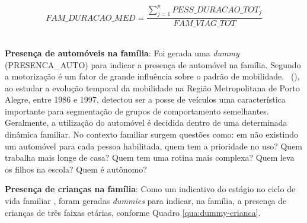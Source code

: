 \begin{compactitem}
\begin{equation}\label{eq:fam-dur-med}
FAM\_DURACAO\_MED=\frac{\displaystyle\sum_{j=1}^{p}PESS\_DURACAO\_TOT_{j}}{FAM\_VIAG\_TOT}
\end{equation}\\

\item \textbf{Presença de automóveis na família}: Foi gerada uma \textit{dummy} \mbox{(PRESENCA_AUTO)} para indicar a presença de automóvel na família.
Segundo  a motorização é um fator de grande influência sobre o padrão de mobilidade. 
\ (\citeyear{PEIXOTO2002}), ao estudar a evolução temporal da mobilidade na Região Metropolitana de Porto Alegre, entre 1986 e 1997, detectou ser a posse de veículos uma característica importante para segmentação de grupos de comportamento semelhantes.
Geralmente, a utilização do automóvel é decidida dentro de uma determinada dinâmica familiar.
No contexto familiar surgem questões como: em não existindo um automóvel para cada pessoa habilitada, quem tem a prioridade no uso? Quem trabalha mais longe de casa? Quem tem uma rotina mais complexa? Quem leva os filhos na escola? Quem é autônomo?\\

\item \textbf{Presença de crianças na família}: Como um indicativo do estágio no ciclo de vida familiar \cite{ORTUZAR1994}, foram geradas \textit{dummies} para indicar, na família, a presença de crianças de três faixas etárias, conforme Quadro \ref{qua:dummy-crianca}.

\begin{quadro}[htb]
\end{quadro}



\end{compactitem}
